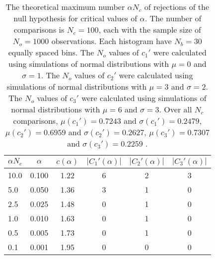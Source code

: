 \begin{table}[h!]
\begin{center}
\begin{tabular}{| l | c | c | c | c | c |}\hline
$\alpha N_c$ & $\alpha$ & $c(\alpha)$ & $|C_1'(\alpha)|$ & $|C_2'(\alpha)|$ & $|C_3'(\alpha)|$ \\\hline
10.0 & 0.100 & 1.22 & 6 & 2 & 3 \\\hline
5.0 & 0.050 & 1.36 & 3 & 1 & 0 \\\hline
2.5 & 0.025 & 1.48 & 0 & 1 & 0 \\\hline
1.0 & 0.010 & 1.63 & 0 & 1 & 0 \\\hline
0.5 & 0.005 & 1.73 & 0 & 1 & 0 \\\hline
0.1 & 0.001 & 1.95 & 0 & 0 & 0 \\\hline
\end{tabular}
\caption{The theoretical maximum number $\alpha N_c$ of rejections
of the null hypothesis for critical values of $\alpha$.
The number of comparisons is $N_c=100$,
each with the sample size of $N_o=1000$ observations.
Each histogram have $N_b=30$ equally spaced bins.
The $N_o$ values of $c_1'$ were calculated using simulations of
 normal distributions with $\mu=0$ and $\sigma=1$.
The $N_o$ values of $c_2'$ were calculated using simulations of
 normal distributions with $\mu=3$ and $\sigma=2$.
The $N_o$ values of $c_3'$ were calculated using simulations of
 normal distributions with $\mu=6$ and $\sigma=3$.
Over all $N_c$ comparisons,
 $\mu(c_1')=0.7243$ and $\sigma(c_1')=0.2479$,
 $\mu(c_2')=0.6959$ and $\sigma(c_2')=0.2627$,
 $\mu(c_3')=0.7307$ and $\sigma(c_3')=0.2259$ .
}
\end{center}
\end{table}